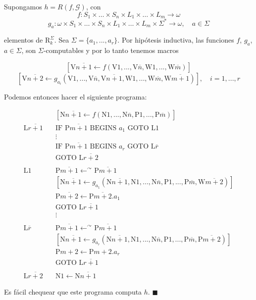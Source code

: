 \documentclass{article}
\begin{document}
Supongamos $h = R(f, \mathcal{G})$, con
\[
f : S_1 \times \ldots \times S_n \times L_1 \times \ldots \times L_m \to \omega
\]
\[
g_a : \omega \times S_1 \times \ldots \times S_n \times L_1 \times \ldots \times L_m \times \Sigma^* \to \omega, \quad a \in \Sigma
\]

elementos de $\text{R}^\Sigma_k$. Sea $\Sigma = \{a_1, ..., a_r\}$. Por hipótesis inductiva, las funciones $f$, $g_a$, $a \in \Sigma$, son $\Sigma$-computables y por lo tanto tenemos macros

\[
[\text{V}\overline{n+1} \gets f(\text{V}1, ..., \text{V}\overline{n}, \text{W}1, ..., \text{W}\overline{m})]
\]
\[
[\text{V}\overline{n+2} \gets g_{a_i}(\text{V}1, ..., \text{V}\overline{n}, \text{V}\overline{n+1}, \text{W}1, ..., \text{W}\overline{m}, \text{W}\overline{m+1})], \quad i = 1, ..., r
\]

\bigskip

Podemos entonces hacer el siguiente programa:

\begin{align*}
\quad & [\text{N}\overline{n+1} \gets f(\text{N}1, ..., \text{N}\overline{n}, \text{P}1, ..., \text{P}\overline{m})] \\
\text{L}\overline{r+1} \text{ }& \text{IF P}\overline{m+1} \text{ BEGINS } a_1 \text{ GOTO L1} \\
& \vdots \\
& \text{IF P}\overline{m+1} \text{ BEGINS } a_r \text{ GOTO L}\overline{r} \\
& \text{GOTO L}\overline{r + 2} \\
\\
\text{L1} \quad & \text{P}\overline{m+1} \gets^\curvearrowright \text{P}\overline{m+1} \\
& [\text{N}\overline{n+1} \gets g_{a_1}(\text{N}\overline{n+1}, \text{N}1, ..., \text{N}\overline{n}, \text{P}1, ..., \text{P}\overline{m}, \text{W}\overline{m+2})] \\
& \text{P}\overline{m+2} \gets \text{P}\overline{m+2}. a_1 \\
& \text{GOTO L}\overline{r+1} \\
& \vdots \\
\\
\text{L}\overline{r} \quad & \text{P}\overline{m+1} \gets^\curvearrowright \text{P}\overline{m+1} \\
& [\text{N}\overline{n+1} \gets g_{a_r}(\text{N}\overline{n+1}, \text{N}1, ..., \text{N}\overline{n}, \text{P}1, ..., \text{P}\overline{m}, \text{P}\overline{m+2})] \\
& \text{P}m+2 \gets \text{P}m + 2 . a_r \\
& \text{GOTO L}\overline{r+1} \\
\\
\text{L}\overline{r+2} \quad & \text{N}1 \gets \text{N}\overline{n+1}
\end{align*}

Es fácil chequear que este programa computa $h$.  \hfill $\blacksquare$
\end{document}
